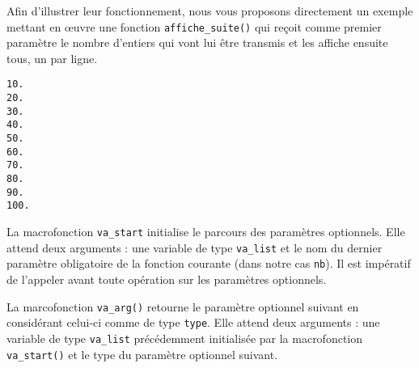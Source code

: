 \documentclass[]{article}
\newenvironment{Shaded}{}{}
\newcommand{\DataTypeTok}[1]{\textcolor[rgb]{0.56,0.13,0.00}{{#1}}}
\newcommand{\DecValTok}[1]{\textcolor[rgb]{0.25,0.63,0.44}{{#1}}}
\newcommand{\SpecialCharTok}[1]{\textcolor[rgb]{0.25,0.44,0.63}{{#1}}}
\newcommand{\StringTok}[1]{\textcolor[rgb]{0.25,0.44,0.63}{{#1}}}
\newcommand{\ImportTok}[1]{{#1}}
\newcommand{\ControlFlowTok}[1]{\textcolor[rgb]{0.00,0.44,0.13}{\textbf{{#1}}}}
\newcommand{\PreprocessorTok}[1]{\textcolor[rgb]{0.74,0.48,0.00}{{#1}}}
\newcommand{\NormalTok}[1]{{#1}}
\begin{document}
Afin d'illustrer leur fonctionnement, nous vous proposons directement un
exemple mettant en œuvre une fonction \texttt{affiche\_suite()} qui
reçoit comme premier paramètre le nombre d'entiers qui vont lui être
transmis et les affiche ensuite tous, un par ligne.

\begin{Shaded}
\end{Shaded}

\begin{verbatim}
10.
20.
30.
40.
50.
60.
70.
80.
90.
100.
\end{verbatim}

La macrofonction \texttt{va\_start} initialise le parcours des
paramètres optionnels. Elle attend deux arguments : une variable de type
\texttt{va\_list} et le nom du dernier paramètre obligatoire de la
fonction courante (dans notre cas \texttt{nb}). Il est impératif de
l'appeler avant toute opération sur les paramètres optionnels.

La marcofonction \texttt{va\_arg()} retourne le paramètre optionnel
suivant en considérant celui-ci comme de type \texttt{type}. Elle attend
deux arguments : une variable de type \texttt{va\_list} précédemment
initialisée par la macrofonction \texttt{va\_start()} et le type du
paramètre optionnel suivant.
\end{document}
